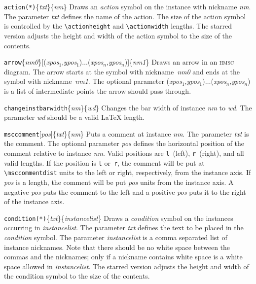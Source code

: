 \documentclass[a4paper]{article}
\newcommand{\cmd}[1]{\texttt{\bslash #1}}
\newcommand{\acro}[1]{{\scshape\lowercase{#1}}}
\newcommand\HMSC{\acro{HMSC}}
\newcommand{\opt}[1]{[#1]}
\newcommand{\cmdarg}[1]{\{\emph{#1}\}}
\newcommand{\coordarg}[1]{\emph{#1}}
\newcommand{\coordargs}[2]{(\coordarg{#1},\coordarg{#2})}
\newenvironment{defs}{%
  \begin{list}{}%
              {\setlength{\labelwidth}{0pt}%
               \setlength{\labelsep}{1em}%
               \setlength{\leftmargin}{1em}%
               \setlength{\parsep}{1ex}%
               \setlength{\listparindent}{0pt}%
               \setlength{\rightmargin}{0pt}%
               \renewcommand{\makelabel}[1]{##1}%
               \raggedright%
              }%
  }{%
  \end{list}}
\begin{document}
\begin{defs}

\item[\cmd{action(*)}\{\emph{txt}\}\{\emph{nm}\}] Draws an \emph{action}
symbol on the instance with nickname \emph{nm}. The parameter \emph{txt}
defines the name of the action. The size of the action symbol is
controlled by the \verb|\actionheight| and \verb|\actionwidth|
lengths. The starred version adjusts the height and width of the
action symbol to the size of the contents.

\item[\cmd{arrow}\cmdarg{nm0}\opt{\coordargs{xpos${}_1$}{ypos${}_1$}$\ldots$\coordargs{xpos${}_n$}{ypos${}_n$}}\cmdarg{nm1}]
Draws an arrow in an \HMSC{} diagram. The arrow starts at the symbol
with nickname~\emph{nm0} and ends at the symbol with
nickname~\emph{nm1}. The optional parameter
\coordargs{xpos${}_1$}{ypos${}_1$}$\ldots$\coordargs{xpos${}_n$}{ypos${}_n$}
is a list of intermediate points the arrow should pass through.

\item[\cmd{changeinstbarwidth}\{\emph{nm}\}\{\emph{wd}\}] Changes the
bar width of instance \emph{nm} to \emph{wd}. The parameter \emph{wd}
should be a valid \LaTeX{} length.

\item[\cmd{msccomment}\opt{\emph{pos}}\{\emph{txt}\}\{\emph{nm}\}] Puts a
comment at instance \emph{nm}. The parameter \emph{txt} is the
comment. The optional parameter \emph{pos} defines the horizontal
position of the comment relative to instance \emph{nm}. Valid
positions are \verb|l|~(left), \verb|r|~(right), and all valid
lengths. If the position is \verb|l| or~\verb|r|, the comment will be
put at \verb|\msccommentdist| units to the left or right, respectively, from
the instance axis. If \emph{pos} is a length, the comment will be put
\emph{pos} units from the instance axis. A negative \emph{pos} puts the
comment to the left and a positive \emph{pos} puts it to the right of
the instance axis.

\item[\cmd{condition(*)}\{\emph{txt}\}\{\emph{instancelist}\}] Draws a
\emph{condition} symbol on the instances occurring in
\emph{instancelist}. The parameter \emph{txt} defines the text to be
placed in the \emph{condition} symbol. The parameter
\emph{instancelist} is a comma separated list of instance
nicknames. Note that there should be no white space between the commas
and the nicknames; only if a nickname contains white space is a white
space allowed in \emph{instancelist}. The starred version adjusts the 
height and width of the condition symbol to the size of the contents. 


\end{defs}
\end{document}
